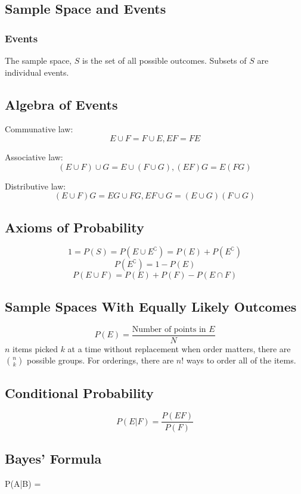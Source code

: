 \subsection{Sample Space and Events}
\subsubsection{Events}
\begin{defi}
  The sample space, $S$ is the set of all possible outcomes.
  Subsets of $S$ are individual events.
\end{defi}
\subsection{Algebra of Events}
Communative law: $$E\cup F = F\cup E, EF=FE$$

Associative law: $$(E \cup F) \cup G = E \cup (F \cup G), (EF)G=E(FG)$$

Distributive law: $$(E\cup F)G = EG\cup FG, EF\cup G = (E\cup G)(F\cup G)$$

\subsection{Axioms of Probability}
\begin{prop}
$$1 = P(S) = P(E \cup E^\complement ) = P(E) + P(E^\complement)$$
$$P(E^\complement) = 1 - P(E)$$
$$P(E \cup F) = P(E) + P(F) - P(E\cap F)$$
\end{prop}

\subsection{Sample Spaces With Equally Likely Outcomes}
$$P(E) = \frac{\text{Number of points in }E}{N}$$
$n$ items picked $k$ at a time without replacement when order matters, there are $\binom{n}{k}$ possible groups.
For orderings, there are $n!$ ways to order all of the items.

\subsection{Conditional Probability}
$$P(E|F) = \frac{P(EF)}{P(F)}$$

\subsection{Bayes' Formula}
$$P(A|B) = 

